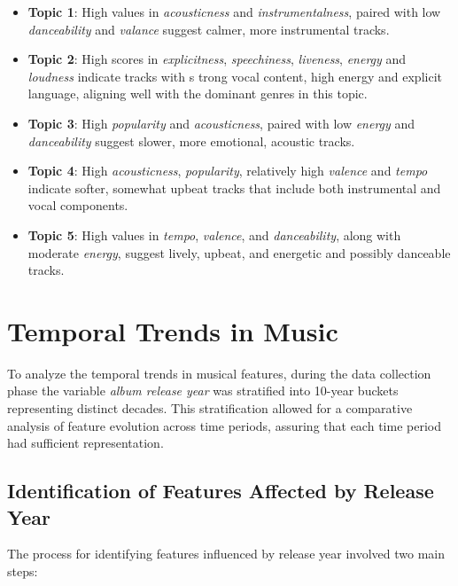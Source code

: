 \begin{itemize}
  \item \textbf{Topic 1}: High values in \textit{acousticness} and
    \textit{instrumentalness}, paired with low \textit{danceability} and
    \textit{valance} suggest calmer, more instrumental tracks.
  \item \textbf{Topic 2}: High scores in \textit{explicitness},
    \textit{speechiness}, \textit{liveness}, \textit{energy} and
    \textit{loudness} indicate tracks with s trong vocal content, high energy
    and explicit language, aligning well with the dominant genres in this
    topic.
  \item \textbf{Topic 3}: High \textit{popularity} and \textit{acousticness},
    paired with low \textit{energy} and  \textit{danceability} suggest slower,
    more emotional, acoustic tracks.
  \item \textbf{Topic 4}: High \textit{acousticness},  \textit{popularity},
    relatively high \textit{valence} and \textit{tempo} indicate softer,
    somewhat upbeat  tracks that include both instrumental and vocal
    components.
  \item \textbf{Topic 5}: High values in \textit{tempo}, \textit{valence}, and
    \textit{danceability}, along with moderate \textit{energy}, suggest lively,
    upbeat, and energetic and possibly danceable tracks.
\end{itemize}


\section{Temporal Trends in Music}
\label{sec:temporaltrends}

To analyze the temporal trends in musical features, during the data collection
phase the variable \textit{album release year} was stratified into 10-year
buckets representing distinct decades. This stratification allowed for a
comparative analysis of feature evolution across time periods, assuring
that each time period had sufficient representation.


\subsection{Identification of Features Affected by Release Year}

The process for identifying features influenced by release year involved two
main steps:

